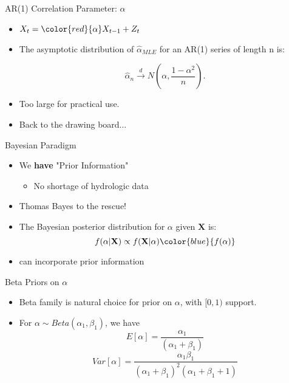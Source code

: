 \documentclass{beamer}
\begin{document}
\begin{frame}{AR(1) Correlation Parameter: \huge{$\alpha$}}  %

\begin{itemize}
\item {\huge $X_{t} = {\color{red} {\alpha}} X_{t-1} + Z_{t}$}
\item The asymptotic distribution of $\hat{\alpha}_{MLE}$ for an AR(1) series of length n is:

	$$ \hat{\alpha}_{n} \xrightarrow{d} N\left(\alpha, \frac{1-\alpha^{2}}{n}\right). $$

\item Too large for practical use.
\item Back to the drawing board...

\end{itemize}
\end{frame}


\begin{frame}{Bayesian Paradigm}  %

\begin{itemize}
\item We {\bf have} "Prior Information"
	\begin{itemize}
	\item No shortage of hydrologic data
	\end{itemize}
\item Thomas Bayes to the rescue!
\item The Bayesian posterior distribution for $\alpha$ given $\mathbf{X}$ is: $$ f(\mathbf{\alpha} |\mathbf{X}) \propto f(\mathbf{X} |\mathbf{\alpha}) \color{blue}{ f(\mathbf{\alpha})} $$
\item {} can incorporate prior information
\end{itemize}

\end{frame}


\begin{frame}{Beta Priors on \huge{$\alpha$}}  %

\begin{itemize}
\item Beta family is natural choice for prior on $\alpha$, with $[0,1)$ support.
\item For $\alpha \sim Beta(\alpha_{1}, \beta_{1})$, we have
$$ E[\alpha] = \frac{\alpha_{1}}{(\alpha_{1} + \beta_{1})} $$
$$ Var[\alpha] = \frac{ \alpha_{1} \beta_{1} }{ (\alpha_{1} + \beta_{1})^{2} (\alpha_{1} + \beta_{1} + 1) } $$
\end{itemize}

\end{frame}
\end{document}

